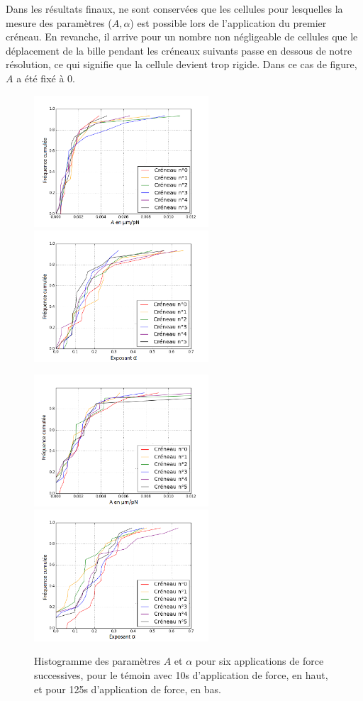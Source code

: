 Dans les résultats finaux, ne sont conservées que les cellules pour lesquelles la mesure des paramètres ($A, \alpha$) est possible lors de l'application du premier créneau. 
En revanche, il arrive pour un nombre non négligeable de cellules que le déplacement de la bille pendant les créneaux suivants passe en dessous de notre résolution, ce qui signifie que la cellule devient trop rigide. Dans ce cas de figure, $A$ a été fixé à 0. 
\begin{center}
\begin{figure}[p]
\includegraphics[width=6.5cm]{Figures/A_creneaux_temoin.png}
\includegraphics[width=6.5cm]{Figures/E_creneaux_temoin.png} 

\includegraphics[width=6.5cm]{Figures/A_creneaux_S2.png} 
\includegraphics[width=6.5cm]{Figures/E_creneaux_S2.png} 
\caption{\label{Evolution_6c} Histogramme des paramètres $A$ et $\alpha$ pour six applications de force successives, pour le témoin avec 10s d’application de force, en haut, et pour 125s d’application de force, en bas.}
\end{figure}
\end{center}
